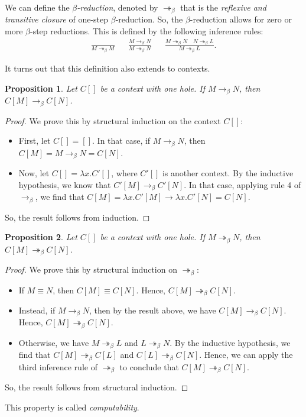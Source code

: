 \documentclass[a4paper, openany]{memoir}
\newtheorem{proposition}{Proposition}[section]
\theoremstyle{definition}
\begin{document}
    We can define the \emph{$\beta$-reduction}, denoted by $\twoheadrightarrow_\beta$ that is the \emph{reflexive and transitive closure} of one-step $\beta$-reduction. So, the $\beta$-reduction allows for zero or more $\beta$-step reductions. This is defined by the following inference rules:
    \begin{align*}
        \frac{}{M \twoheadrightarrow_\beta M} && \frac{M \to_\beta N}{M \twoheadrightarrow_\beta N} && \frac{M \twoheadrightarrow_\beta N \quad N \twoheadrightarrow_\beta L}{M \twoheadrightarrow_\beta L}.
    \end{align*}

    It turns out that this definition also extends to contexts.
    \begin{proposition}
        Let $C[]$ be a context with one hole. If $M \to_\beta N$, then $C[M] \to_\beta C[N]$.
    \end{proposition}
    \begin{proof}
        We prove this by structural induction on the context $C[]$:
        \begin{itemize}
            \item First, let $C[] = []$. In that case, if $M \to_\beta N$, then $C[M] = M \to_\beta N = C[N]$.
            \item Now, let $C[] = \lambda x.C'[]$, where $C'[]$ is another context. By the inductive hypothesis, we know that $C'[M] \to_\beta C'[N]$. In that case, applying rule 4 of $\to_\beta$, we find that $C[M] = \lambda x.C'[M] \to \lambda x.C'[N] = C[N]$.
        \end{itemize}
        So, the result follows from induction.
    \end{proof}
    \begin{proposition}
        Let $C[]$ be a context with one hole.  If $M \twoheadrightarrow_\beta N$, then $C[M] \twoheadrightarrow_\beta C[N]$.
    \end{proposition}
    \begin{proof}
        We prove this by structural induction on $\twoheadrightarrow_\beta$:
        \begin{itemize}
            \item If $M \equiv N$, then $C[M] \equiv C[N]$. Hence, $C[M] \twoheadrightarrow_\beta C[N]$.
            \item Instead, if $M \to_\beta N$, then by the result above, we have $C[M] \to_\beta C[N]$. Hence, $C[M] \twoheadrightarrow_\beta C[N]$.
            \item Otherwise, we have $M \twoheadrightarrow_\beta L$ and $L \twoheadrightarrow_\beta N$. By the inductive hypothesis, we find that $C[M] \twoheadrightarrow_\beta C[L]$ and $C[L] \twoheadrightarrow_\beta C[N]$. Hence, we can apply the third inference rule of $\twoheadrightarrow_\beta$ to conclude that $C[M] \twoheadrightarrow_\beta C[N]$.
        \end{itemize}
        So, the result follows from structural induction.
    \end{proof}
    \noindent This property is called \emph{computability}.
    \newpage
\end{document}
